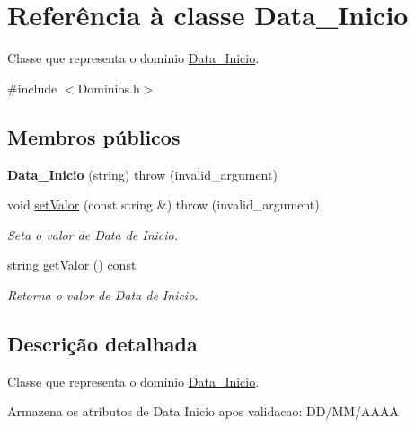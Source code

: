 \hypertarget{class_data___inicio}{
\section{\-Referência à classe \-Data\-\_\-\-Inicio}
\label{class_data___inicio}
}


\-Classe que representa o dominio \hyperlink{class_data___inicio}{\-Data\-\_\-\-Inicio}.  




{\ttfamily \#include $<$\-Dominios.\-h$>$}

\subsection*{\-Membros públicos}
\begin{DoxyCompactItemize}
\item 
\hypertarget{class_data___inicio_ad8c906741947b96d199ca5300704cd57}{
{\bfseries \-Data\-\_\-\-Inicio} (string)  throw (invalid\-\_\-argument)}
\label{class_data___inicio_ad8c906741947b96d199ca5300704cd57}

\item 
void \hyperlink{class_data___inicio_ad859eb0240b8e0eed36e3768855ed750}{set\-Valor} (const string \&)  throw (invalid\-\_\-argument)
\begin{DoxyCompactList}\small\item\em \-Seta o valor de \-Data de \-Inicio. \end{DoxyCompactList}\item 
string \hyperlink{class_data___inicio_ac2e2c96554bda3c8b2e1bacd0ce63682}{get\-Valor} () const 
\begin{DoxyCompactList}\small\item\em \-Retorna o valor de \-Data de \-Inicio. \end{DoxyCompactList}\end{DoxyCompactItemize}


\subsection{\-Descrição detalhada}
\-Classe que representa o dominio \hyperlink{class_data___inicio}{\-Data\-\_\-\-Inicio}. 

\-Armazena os atributos de \-Data \-Inicio apos validacao\-: \-D\-D/\-M\-M/\-A\-A\-A\-A 

